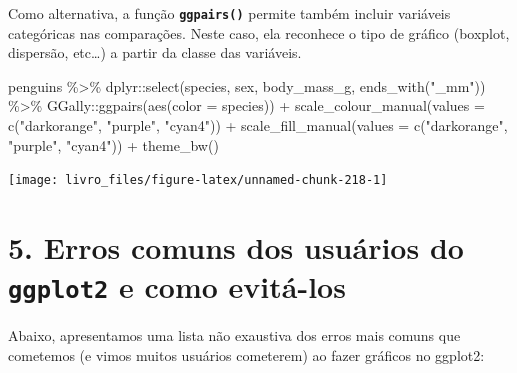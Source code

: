 \documentclass[
]{book}
\newenvironment{Shaded}{\begin{snugshade}}{\end{snugshade}}
\newcommand{\AttributeTok}[1]{\textcolor[rgb]{0.61,0.61,0.61}{#1}}
\newcommand{\FunctionTok}[1]{\textcolor[rgb]{0,0,0}{#1}}
\newcommand{\NormalTok}[1]{#1}
\newcommand{\SpecialCharTok}[1]{\textcolor[rgb]{0,0,0}{#1}}
\newcommand{\StringTok}[1]{\textcolor[rgb]{0.5,0.5,0.5}{#1}}
\begin{document}
Como alternativa, a função \textbf{\texttt{ggpairs()}} permite também incluir variáveis categóricas nas comparações. Neste caso, ela reconhece o tipo de gráfico (boxplot, dispersão, etc\ldots) a partir da classe das variáveis.

\begin{Shaded}
\begin{Highlighting}[]
\NormalTok{penguins }\SpecialCharTok{\%\textgreater{}\%}
\NormalTok{  dplyr}\SpecialCharTok{::}\FunctionTok{select}\NormalTok{(species, sex, body\_mass\_g, }\FunctionTok{ends\_with}\NormalTok{(}\StringTok{"\_mm"}\NormalTok{)) }\SpecialCharTok{\%\textgreater{}\%}
\NormalTok{  GGally}\SpecialCharTok{::}\FunctionTok{ggpairs}\NormalTok{(}\FunctionTok{aes}\NormalTok{(}\AttributeTok{color =}\NormalTok{ species)) }\SpecialCharTok{+}
  \FunctionTok{scale\_colour\_manual}\NormalTok{(}\AttributeTok{values =} \FunctionTok{c}\NormalTok{(}\StringTok{"darkorange"}\NormalTok{, }\StringTok{"purple"}\NormalTok{, }\StringTok{"cyan4"}\NormalTok{)) }\SpecialCharTok{+}
  \FunctionTok{scale\_fill\_manual}\NormalTok{(}\AttributeTok{values =} \FunctionTok{c}\NormalTok{(}\StringTok{"darkorange"}\NormalTok{, }\StringTok{"purple"}\NormalTok{, }\StringTok{"cyan4"}\NormalTok{)) }\SpecialCharTok{+}
  \FunctionTok{theme\_bw}\NormalTok{()}
\end{Highlighting}
\end{Shaded}

\begin{center}\texttt{[image: livro\_files/figure-latex/unnamed-chunk-218-1]} \end{center}

\hypertarget{erros-comuns-dos-usuuxe1rios-do-ggplot2-e-como-evituxe1-los}{%
\section{\texorpdfstring{5. Erros comuns dos usuários do \texttt{ggplot2} e como evitá-los}{5. Erros comuns dos usuários do ggplot2 e como evitá-los}}\label{erros-comuns-dos-usuuxe1rios-do-ggplot2-e-como-evituxe1-los}}

Abaixo, apresentamos uma lista não exaustiva dos erros mais comuns que cometemos (e vimos muitos usuários cometerem) ao fazer gráficos no ggplot2:
\end{document}
